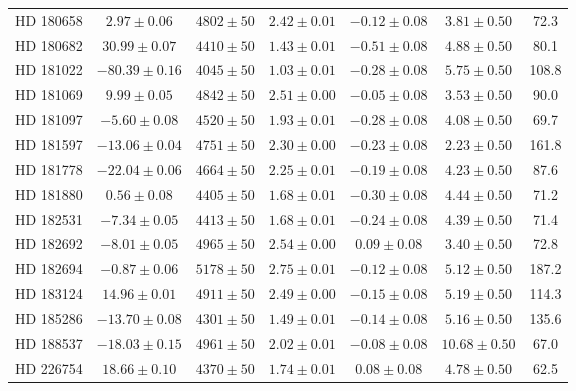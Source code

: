 \begin{table*}
\begin{tabular}{ccccccc}
HD 180658 & $2.97 \pm 0.06$ & $4802 \pm 50$ & $2.42 \pm 0.01$ & $-0.12 \pm 0.08$ & $3.81 \pm 0.50$ & 72.3 \\
HD 180682 & $30.99 \pm 0.07$ & $4410 \pm 50$ & $1.43 \pm 0.01$ & $-0.51 \pm 0.08$ & $4.88 \pm 0.50$ & 80.1 \\
HD 181022 & $-80.39 \pm 0.16$ & $4045 \pm 50$ & $1.03 \pm 0.01$ & $-0.28 \pm 0.08$ & $5.75 \pm 0.50$ & 108.8 \\
HD 181069 & $9.99 \pm 0.05$ & $4842 \pm 50$ & $2.51 \pm 0.00$ & $-0.05 \pm 0.08$ & $3.53 \pm 0.50$ & 90.0 \\
HD 181097 & $-5.60 \pm 0.08$ & $4520 \pm 50$ & $1.93 \pm 0.01$ & $-0.28 \pm 0.08$ & $4.08 \pm 0.50$ & 69.7 \\
HD 181597 & $-13.06 \pm 0.04$ & $4751 \pm 50$ & $2.30 \pm 0.00$ & $-0.23 \pm 0.08$ & $2.23 \pm 0.50$ & 161.8 \\
HD 181778 & $-22.04 \pm 0.06$ & $4664 \pm 50$ & $2.25 \pm 0.01$ & $-0.19 \pm 0.08$ & $4.23 \pm 0.50$ & 87.6 \\
HD 181880 & $0.56 \pm 0.08$ & $4405 \pm 50$ & $1.68 \pm 0.01$ & $-0.30 \pm 0.08$ & $4.44 \pm 0.50$ & 71.2 \\
HD 182531 & $-7.34 \pm 0.05$ & $4413 \pm 50$ & $1.68 \pm 0.01$ & $-0.24 \pm 0.08$ & $4.39 \pm 0.50$ & 71.4 \\
HD 182692 & $-8.01 \pm 0.05$ & $4965 \pm 50$ & $2.54 \pm 0.00$ & $0.09 \pm 0.08$ & $3.40 \pm 0.50$ & 72.8 \\
HD 182694 & $-0.87 \pm 0.06$ & $5178 \pm 50$ & $2.75 \pm 0.01$ & $-0.12 \pm 0.08$ & $5.12 \pm 0.50$ & 187.2 \\
HD 183124 & $14.96 \pm 0.01$ & $4911 \pm 50$ & $2.49 \pm 0.00$ & $-0.15 \pm 0.08$ & $5.19 \pm 0.50$ & 114.3 \\
HD 185286 & $-13.70 \pm 0.08$ & $4301 \pm 50$ & $1.49 \pm 0.01$ & $-0.14 \pm 0.08$ & $5.16 \pm 0.50$ & 135.6 \\
HD 188537 & $-18.03 \pm 0.15$ & $4961 \pm 50$ & $2.02 \pm 0.01$ & $-0.08 \pm 0.08$ & $10.68 \pm 0.50$ & 67.0 \\
HD 226754 & $18.66 \pm 0.10$ & $4370 \pm 50$ & $1.74 \pm 0.01$ & $0.08 \pm 0.08$ & $4.78 \pm 0.50$ & 62.5 \\
\hline
\end{tabular}
\end{table*}
